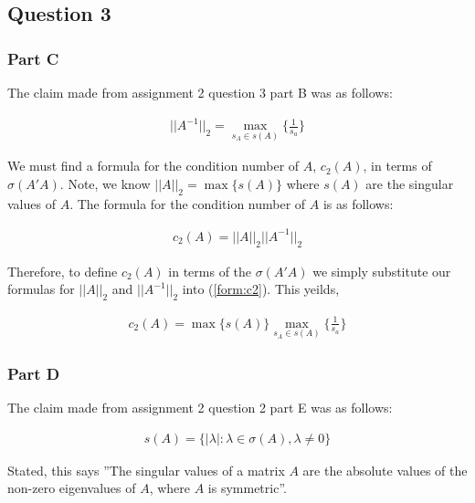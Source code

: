 

\newpage


\newpage
\subsection{Question 3}

\subsubsection{Part C}

The claim made from assignment 2 question 3 part B was as follows:

\begin{eqnarray}
  ||A^{-1}||_2 = \max_{s_A \in s(A)} \{\frac{1}{s_a}\}
\end{eqnarray}

We must find a formula for the condition number of \(A\), \(c_2(A)\), in terms of \(\sigma(A'A)\).
Note, we know \(||A||_2 = \max \{ s(A) \}\) where \(s(A)\) are the singular values of \(A\).
The formula for the condition number of \(A\) is as follows:

\begin{eqnarray}
  c_2(A) = ||A||_2||A^{-1}||_2
  \label{form:c2}
\end{eqnarray}

Therefore, to define \(c_2(A)\) in terms of the \(\sigma(A'A)\) we simply substitute our formulas for \(||A||_2\) and \(||A^{-1}||_2\) into (\ref{form:c2}).
This yeilds,

\begin{eqnarray}
  c_2(A) = \max \{s(A)\} \max_{s_A \in s(A)} \{\frac{1}{s_a}\}
\end{eqnarray}

\subsubsection{Part D}

The claim made from assignment 2 question 2 part E was as follows:

\begin{eqnarray}
  s(A) = \{|\lambda| : \lambda \in \sigma(A), \lambda \neq 0\}
  \label{form:sasym}
\end{eqnarray}

Stated, this says ''The singular values of a matrix \(A\) are the absolute values of the non-zero eigenvalues of \(A\), where \(A\) is symmetric''.

